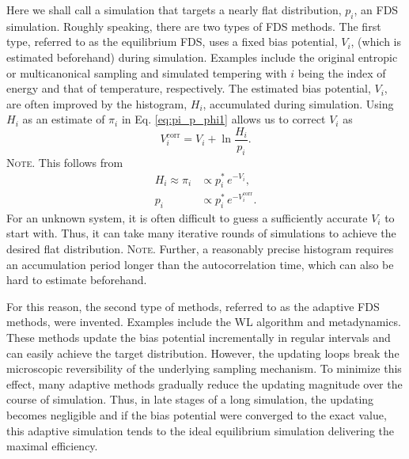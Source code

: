 \documentclass[reprint, floatfix]{revtex4-1}
\newcommand{\note}[1]{{\color{DarkGreen}\footnotesize \textsc{Note.} #1}}
\begin{document}
Here we shall call a simulation that targets
a nearly flat distribution\cite{
dayal2004, trebst2004, zhang2007, barducci2008, singh2011},
$p_i$,
an FDS simulation.
%
Roughly speaking, there are two types of FDS methods.
%
The first type,
referred to as the equilibrium FDS, %
uses a fixed bias potential, $V_i$,
(which is estimated beforehand)
during simulation.
%
Examples include the original
entropic or multicanonical sampling\cite{
berg1992, lee1993}
and simulated tempering\cite{
marinari1992, lyubartsev1992}
with $i$ being the index of energy
and that of temperature, respectively.
%
The estimated bias potential, $V_i$,
are often improved
by the histogram, $H_i$, accumulated
during simulation.
%
Using $H_i$ as an estimate of $\pi_i$ in
Eq. \eqref{eq:pi_p_phi1}
allows us to correct $V_i$ as
%
\begin{equation}
V^\mathrm{corr}_i
=
V_i
+
\ln \frac{ H_i }
         { p_i }.
\label{eq:vcorr_equil}
\end{equation}
%
\note{This follows from
  $$
  \begin{aligned}
    H_i \approx \pi_i
    &\propto p^*_i \, e^{-V_i},
    \\
    p_i
    &\propto p^*_i \, e^{-V^\mathrm{corr}_i}.
  \end{aligned}
  $$
}
For an unknown system,
it is often difficult
to guess a sufficiently accurate
$V_i$ to start with.
%
Thus,
it can take many iterative rounds of simulations
to achieve the desired flat distribution.
%
\note{Further, a reasonably precise histogram
requires an accumulation period
longer than the autocorrelation time,
which can also be hard to estimate beforehand.}

For this reason, the second type of methods,
referred to as the adaptive FDS methods,
were invented.
%
Examples include
the WL algorithm and metadynamics.
%
These methods update the bias potential
incrementally in regular intervals
and can easily achieve the target distribution.
%
However,
the updating loops break the microscopic reversibility
of the underlying sampling mechanism.
%
%
To minimize this effect,
many adaptive methods gradually
reduce the updating magnitude
over the course of simulation\cite{
marsili2006,
liang2007,
belardinelli2007, belardinelli2007jcp, belardinelli2008,
barducci2008}.
%
Thus, in late stages of a long simulation,
the updating becomes negligible and
%
if the bias potential were converged to the exact value,
this adaptive simulation tends to the ideal equilibrium simulation
delivering the maximal efficiency.
\end{document}

